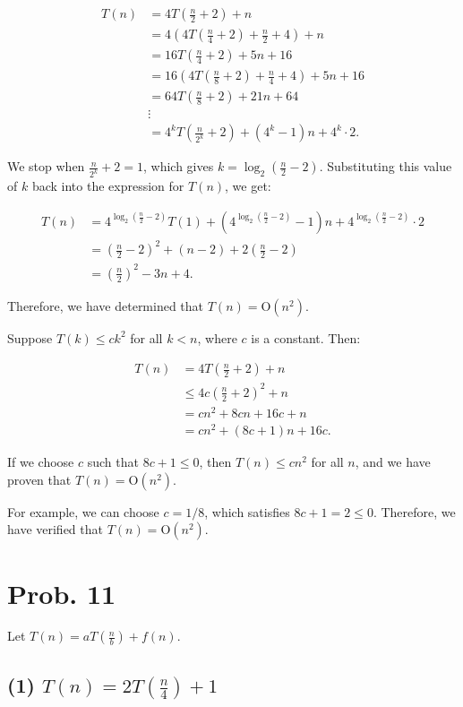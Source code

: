 \documentclass[12pt]{article}
\begin{document}
\begin{align*}
T(n) &= 4T(\frac{n}{2} + 2) + n \\
&= 4(4T(\frac{n}{4} + 2) + \frac{n}{2} + 4) + n \\
&= 16T(\frac{n}{4} + 2) + 5n + 16 \\
&= 16(4T(\frac{n}{8} + 2) + \frac{n}{4} + 4) + 5n + 16 \\
&= 64T(\frac{n}{8} + 2) + 21n + 64 \\
&\vdots \\
&= 4^kT(\frac{n}{2^k} + 2) + (4^k - 1)n + 4^k\cdot 2.
\end{align*}

We stop when $\frac{n}{2^k} + 2 = 1$, which gives $k = \log_2 (\frac{n}{2} - 2)$. Substituting this value of $k$ back into the expression for $T(n)$, we get:

\begin{align*}
T(n) &= 4^{\log_2 (\frac{n}{2} - 2)} T(1) + (4^{\log_2 (\frac{n}{2} - 2)} - 1)n + 4^{\log_2 (\frac{n}{2} - 2)}\cdot 2 \\
&= (\frac{n}{2} - 2)^2 + (n-2) + 2(\frac{n}{2} - 2) \\
&= (\frac{n}{2})^2 - 3n + 4.
\end{align*}

Therefore, we have determined that $T(n) = \mathrm{O}(n^2)$.

Suppose $T(k) \leq ck^2$ for all $k < n$, where $c$ is a constant. Then:

\begin{align*}
T(n) &= 4T(\frac{n}{2} + 2) + n \\
&\leq 4c(\frac{n}{2} + 2)^2 + n \\
&= cn^2 + 8cn + 16c + n \\
&= cn^2 + (8c + 1)n + 16c.
\end{align*}

If we choose $c$ such that $8c + 1 \leq 0$, then $T(n) \leq cn^2$ for all $n$, and we have proven that $T(n) = \mathrm{O}(n^2)$.

For example, we can choose $c = 1/8$, which satisfies $8c + 1 = 2 \leq 0$. Therefore, we have verified that $T(n) = \mathrm{O}(n^2)$.

\section{Prob. 11}

Let $T(n) = aT(\frac{n}{b}) + f(n)$.

\subsection{(1) $ T(n) = 2T(\frac{n}{4}) + 1$}
\end{document}
